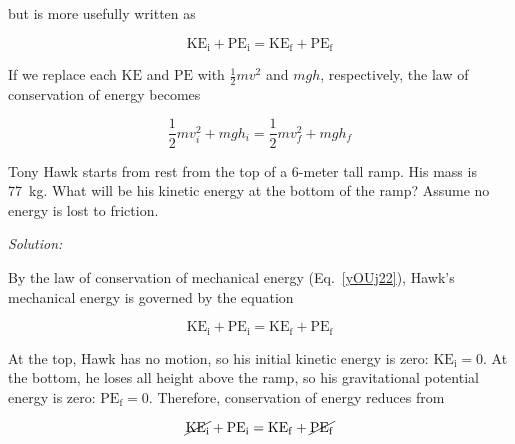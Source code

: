 \documentclass[dvipsnames]{article}
\begin{document}
but is more usefully written as

\begin{equation} \label{yOUj22}
    \mathrm{KE_i} + \mathrm{PE_i} = \mathrm{KE_f} + \mathrm{PE_f}
\end{equation}

If we replace each $\mathrm{KE}$ and $\mathrm{PE}$ with $\frac{1}{2}mv^2$ and $mgh$, respectively, the law of conservation of energy becomes

\begin{equation} \label{ZSmSin}
    \frac{1}{2} m v_i^2 + mgh_i  = 
    \frac{1}{2} m v_f^2 + mgh_f 
\end{equation}

\begin{example} \label{mUfgIz}
Tony Hawk starts from rest from the top of a 6-meter tall ramp. His mass is \SI{77}{kg}. What will be his kinetic energy at the bottom of the ramp? Assume no energy is lost to friction.


\begin{center}
\end{center}
\end{example} 

\textit{Solution:} 

By the law of conservation of mechanical energy (Eq.~\ref{yOUj22}), Hawk's mechanical energy is governed by the equation

\begin{equation*} 
    \mathrm{KE_i} + \mathrm{PE_i} = \mathrm{KE_f} + \mathrm{PE_f}
\end{equation*}

At the top, Hawk has no motion, so his initial kinetic energy is zero: $\mathrm{KE_i} = 0$. At the bottom, he loses all height above the ramp, so his gravitational potential energy is zero: $\mathrm{PE_f} = 0$. Therefore, conservation of energy reduces from

\begin{equation*}
    \cancel{\mathrm{KE_i}} + \mathrm{PE_i} = \mathrm{KE_f} + \cancel{\mathrm{PE_f}}
\end{equation*}
\end{document}
